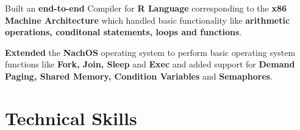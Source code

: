 \documentclass[a4paper]{norm-resume}
\begin{document}
    \vspace{2mm}
    
    				
    \vspace{0.45mm}
	\begin{tightitemize}
	\small
	{
	\item Built an \textbf{end-to-end} Compiler for \textbf{R Language} corresponding to the \textbf{x86 Machine Architecture} which handled
	basic functionality like \textbf{arithmetic operations, conditonal statements, loops and functions}.
    }
	\end{tightitemize}
	
	\vspace{2mm}
	
	       \duration{Jul '15 - Nov '15}
    \vspace{0.45mm}
    \begin{tightitemize}
	\small
	{
	\item \textbf{Extended} the \textbf{NachOS} operating system to perform basic operating system functions like \textbf{Fork, Join, Sleep} and \textbf{Exec} and added support for \textbf{Demand Paging, Shared Memory, Condition Variables} and \textbf{Semaphores}.
    }
	\end{tightitemize}
\vspace{1mm}	%

\section{Technical Skills}

\vspace{0.75mm}	%

 \hfill {} \\
\vspace{1mm}	%
 \hfill {} \\
\vspace{1mm}	%
 \hfill {}
\vspace{1mm}	%
\end{document}
